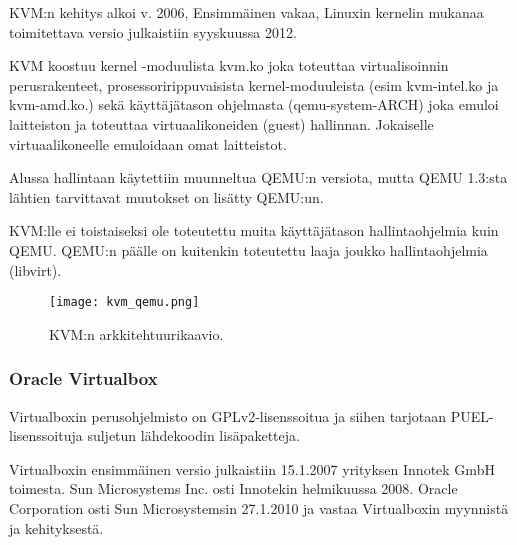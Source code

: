 KVM:n kehitys alkoi v. 2006, Ensimmäinen vakaa, Linuxin kernelin mukanaa toimitettava versio julkaistiin syyskuussa 2012.

KVM koostuu kernel -moduulista kvm.ko joka toteuttaa virtualisoinnin perusrakenteet, prosessoririppuvaisista kernel-moduuleista (esim kvm-intel.ko ja kvm-amd.ko.) sekä käyttäjätason ohjelmasta (qemu-system-ARCH) joka emuloi laitteiston ja toteuttaa virtuaalikoneiden (guest) hallinnan. Jokaiselle virtuaalikoneelle emuloidaan omat laitteistot.

Alussa hallintaan käytettiin muunneltua QEMU:n versiota, mutta QEMU 1.3:sta lähtien tarvittavat muutokset on lisätty QEMU:un.

 KVM:lle ei toistaiseksi ole toteutettu muita käyttäjätason hallintaohjelmia kuin QEMU. QEMU:n päälle on kuitenkin toteutettu laaja joukko hallintaohjelmia (libvirt).


\begin{figure}[H]
\centering
\texttt{[image: kvm\_qemu.png]}
\caption{KVM:n arkkitehtuurikaavio.}
\end{figure}

\subsubsection{Oracle Virtualbox}


Virtualboxin perusohjelmisto on GPLv2-lisenssoitua ja siihen tarjotaan  PUEL-lisenssoituja suljetun lähdekoodin lisäpaketteja.

Virtualboxin ensimmäinen versio julkaistiin 15.1.2007 yrityksen Innotek GmbH toimesta. Sun Microsystems Inc. osti Innotekin helmikuussa 2008. Oracle Corporation osti Sun Microsystemsin 27.1.2010 ja vastaa Virtualboxin myynnistä ja kehityksestä.


